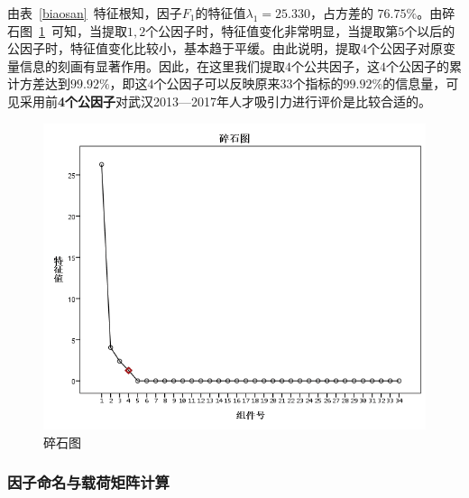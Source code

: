 \documentclass{whutmod}
\begin{document}
\begin{itemize}
	
	由表~\ref{biaosan}~特征根知，因子$F_{1}$的特征值$\lambda_{1}=25.330$，占方差的 $76.75\%$。由碎石图~\ref{123}~可知，当提取$1,2$个公因子时，特征值变化非常明显，当提取第$5$个以后的公因子时，特征值变化比较小，基本趋于平缓。由此说明，提取$4$个公因子对原变量信息的刻画有显著作用。因此，在这里我们提取$4$个公共因子，这$4$个公因子的累计方差达到$99.92\%$，即这$4$个公因子可以反映原来$33$个指标的$99.92\%$的信息量，可见采用前\textbf{4个公因子}对武汉2013—2017年人才吸引力进行评价是比较合适的。
	
	\begin{figure}[H]
		\centering
		\includegraphics[width=\textwidth]{figures/123.png}
		\caption{碎石图}\label{123}
	\end{figure} 
	
	\subsubsection{因子命名与载荷矩阵计算}


\end{itemize}
\end{document}
